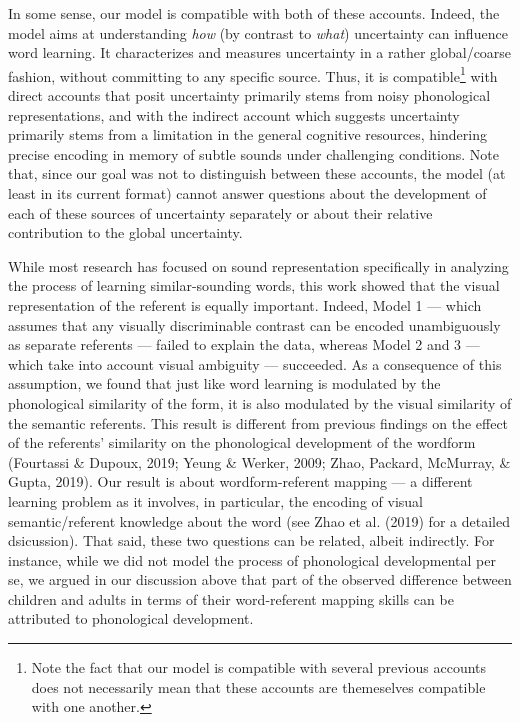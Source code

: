 \documentclass[english,,man]{apa6}
\let\rmarkdownfootnote\footnote%
\def\footnote{\protect\rmarkdownfootnote}
\begin{document}
In some sense, our model is compatible with both of these accounts. Indeed, the model aims at understanding \emph{how} (by contrast to \emph{what}) uncertainty can influence word learning. It characterizes and measures uncertainty in a rather global/coarse fashion, without committing to any specific source. Thus, it is compatible\footnote{Note the fact that our model is compatible with several previous accounts does not necessarily mean that these accounts are themeselves compatible with one another.} with direct accounts that posit uncertainty primarily stems from noisy phonological representations, and with the indirect account which suggests uncertainty primarily stems from a limitation in the general cognitive resources, hindering precise encoding in memory of subtle sounds under challenging conditions. Note that, since our goal was not to distinguish between these accounts, the model (at least in its current format) cannot answer questions about the development of each of these sources of uncertainty separately or about their relative contribution to the global uncertainty.

While most research has focused on sound representation specifically in analyzing the process of learning similar-sounding words, this work showed that the visual representation of the referent is equally important. Indeed, Model 1 --- which assumes that any visually discriminable contrast can be encoded unambiguously as separate referents --- failed to explain the data, whereas Model 2 and 3 --- which take into account visual ambiguity --- succeeded. As a consequence of this assumption, we found that just like word learning is modulated by the phonological similarity of the form, it is also modulated by the visual similarity of the semantic referents. This result is different from previous findings on the effect of the referents' similarity on the phonological development of the wordform (Fourtassi \& Dupoux, 2019; Yeung \& Werker, 2009; Zhao, Packard, McMurray, \& Gupta, 2019). Our result is about wordform-referent mapping --- a different learning problem as it involves, in particular, the encoding of visual semantic/referent knowledge about the word (see Zhao et al. (2019) for a detailed dsicussion). That said, these two questions can be related, albeit indirectly. For instance, while we did not model the process of phonological developmental per se, we argued in our discussion above that part of the observed difference between children and adults in terms of their word-referent mapping skills can be attributed to phonological development.
\end{document}
